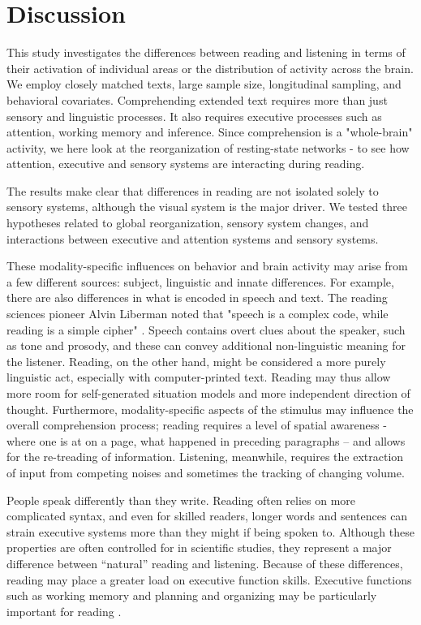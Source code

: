 \section{Discussion}

This study investigates the differences between reading and listening in terms of their activation of individual areas or the distribution of activity across the brain. We employ closely matched texts, large sample size, longitudinal sampling, and behavioral covariates. Comprehending extended text requires more than just sensory and linguistic processes. It also requires executive processes such as attention, working memory and inference. Since comprehension is a "whole-brain" activity, we here look at the reorganization of resting-state networks - to see how attention, executive and sensory systems are interacting during reading.

The results make clear that differences in reading are not isolated solely to sensory systems, although the visual system is the major driver. We tested three hypotheses related to global reorganization, sensory system changes, and interactions between executive and attention systems and sensory systems.

These modality-specific influences on behavior and brain activity may arise from a few different sources: subject, linguistic and innate differences. For example, there are also differences in what is encoded in speech and text. The reading sciences pioneer Alvin Liberman noted that "speech is a complex code, while reading is a simple cipher" \cite{Mattingly1971}. Speech contains overt clues about the speaker, such as tone and prosody, and these can convey additional non-linguistic meaning for the listener. Reading, on the other hand, might be considered a more purely linguistic act, especially with computer-printed text. Reading may thus allow more room for self-generated situation models and more independent direction of thought. Furthermore, modality-specific aspects of the stimulus may influence the overall comprehension process; reading requires a level of spatial awareness -where one is at on a page, what happened in preceding paragraphs – and allows for the re-treading of information. Listening, meanwhile, requires the extraction of input from competing noises and sometimes the tracking of changing volume. 

People speak differently than they write. Reading often relies on more complicated syntax, and even for skilled readers, longer words and sentences can strain executive systems more than they might if being spoken to. Although these properties are often controlled for in scientific studies, they represent a major difference between “natural” reading and listening. Because of these differences, reading may place a greater load on executive function skills. Executive functions such as working memory and planning and organizing may be particularly important for reading \citep{Cain2006}.  


